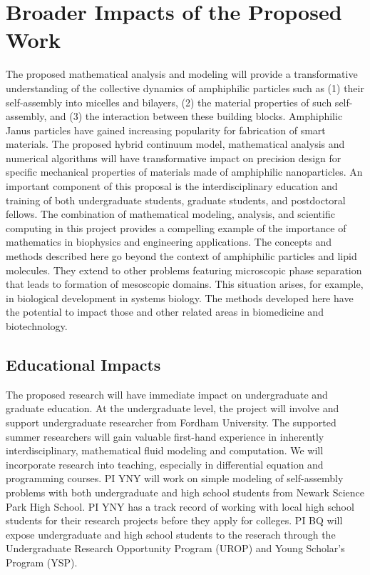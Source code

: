 \section{Broader Impacts of the Proposed Work}
\label{sec:BroaderImpacts}

The proposed mathematical analysis and modeling will provide a
transformative understanding of the collective dynamics of amphiphilic
particles such as (1) their self-assembly into micelles and bilayers, (2) the material properties of such self-assembly, 
and (3) the interaction between these building blocks. Amphiphilic Janus
particles have gained increasing popularity for fabrication of smart
materials. The proposed hybrid continuum model, mathematical analysis
and numerical algorithms will have transformative impact on precision
design for specific mechanical properties of materials made of
amphiphilic nanoparticles. An important component of this proposal is
the interdisciplinary education and training of both undergraduate
students, graduate students, and postdoctoral fellows. The combination
of mathematical modeling, analysis, and scientific computing in this
project provides a compelling example of the importance of mathematics
in biophysics and engineering applications. The concepts and methods
described here go beyond the context of amphiphilic particles and lipid
molecules. They extend to other problems featuring microscopic phase
separation that leads to formation of mesoscopic domains. This situation
arises, for example, in biological development in systems biology. The
methods developed here have the potential to impact those and other
related areas in biomedicine and biotechnology.

\subsection{Educational Impacts}
\label{subsec:Educational_plans}
The proposed research will have immediate impact on undergraduate and
graduate education. At the undergraduate level, the project will involve
and support undergraduate researcher from Fordham University. The
supported summer researchers will gain valuable first-hand experience in
inherently interdisciplinary, mathematical fluid modeling and
computation. We will incorporate research into teaching, especially in
differential equation and programming courses. PI YNY will work on simple modeling of self-assembly problems 
with both undergraduate and high school students from Newark Science Park High School. 
PI YNY has a track record of working with local high school students for their research projects before they apply for colleges.
PI BQ will expose
undergraduate and high school students to the reserach through the
Undergraduate Research Opportunity Program (UROP) and Young Scholar's
Program (YSP).

